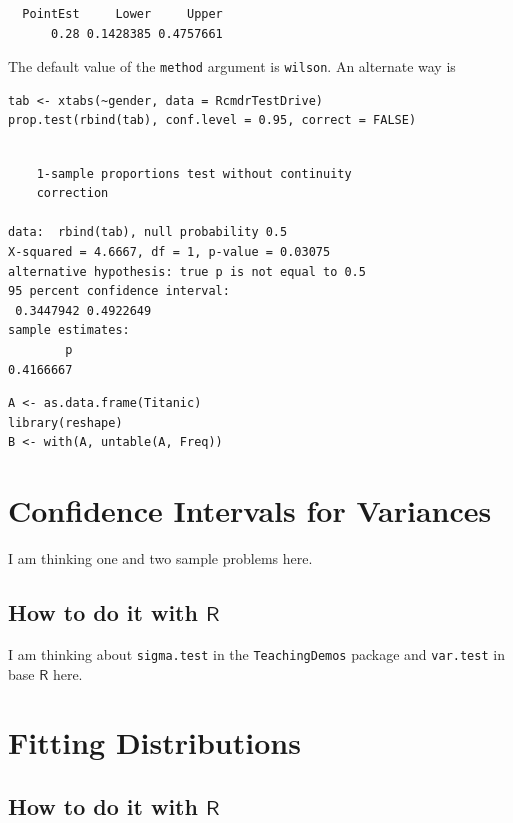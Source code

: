 \documentclass[captions=tableheading]{scrbook}
\begin{document}
\begin{verbatim}
  PointEst     Lower     Upper
      0.28 0.1428385 0.4757661
\end{verbatim}

The default value of the \texttt{method} argument is \texttt{wilson}.  An alternate way is 



\begin{verbatim}
tab <- xtabs(~gender, data = RcmdrTestDrive)
prop.test(rbind(tab), conf.level = 0.95, correct = FALSE)
\end{verbatim}


\begin{verbatim}

	1-sample proportions test without continuity
	correction

data:  rbind(tab), null probability 0.5 
X-squared = 4.6667, df = 1, p-value = 0.03075
alternative hypothesis: true p is not equal to 0.5 
95 percent confidence interval:
 0.3447942 0.4922649 
sample estimates:
        p 
0.4166667
\end{verbatim}


\begin{verbatim}
A <- as.data.frame(Titanic)
library(reshape)
B <- with(A, untable(A, Freq))
\end{verbatim}
\section{Confidence Intervals for Variances}
\label{sec-9-5}
\label{sec-Confidence-Intervals-for-Variances}


I am thinking one and two sample problems here.
\subsection{How to do it with \(\mathsf{R}\)}
\label{sec-9-5-1}


I am thinking about \texttt{sigma.test} in the \texttt{TeachingDemos} package and \texttt{var.test} in base \(\mathsf{R}\) here.
\section{Fitting Distributions}
\label{sec-9-6}
\label{sec-Fitting-Distributions}
\subsection{How to do it with \(\mathsf{R}\)}
\label{sec-9-6-1}
\end{document}
